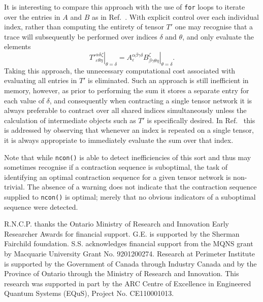 \documentclass[aps,prb,reprint,superscriptaddress,amsmath,amsfonts]{revtex4-1}
\theoremstyle{definition}
\newcommand{\rcite}[1]{Ref.~\onlinecite{#1}}
\newcommand{\ttt}[1]{\texttt{#1}}
\begin{document}
It is interesting to compare this approach with the use of \ttt{for} loops to iterate over the entries in $A$ and $B$ as in \rcite{lam1997}. With explicit control over each individual index, rather than computing the entirety of tensor $T'$ one may recognise that a trace will subsequently be performed over indices $\delta$ and $\theta$, and only evaluate the elements 
\begin{equation}
\left.T'{}^{\alpha\delta\zeta}_{\varepsilon\theta\eta}\right|_{\theta=\delta} = \left.A^{\alpha\beta\gamma\delta}_\varepsilon B^\zeta_{\beta\gamma\theta\eta}\right|_{\theta=\delta}. 
\end{equation}
Taking this approach, the unnecessary computational cost associated with evaluating all entries in $T'$ is eliminated. Such an approach is still inefficient in memory, however, as prior to performing the sum it stores a separate entry for each value of $\delta$,
and consequently when contracting a single tensor network it is always preferable to contract over all shared indices simultaneously %
unless the calculation of intermediate objects such as $T'$ is specifically desired.
In \rcite{lam1997} this is addressed by observing that whenever an index is repeated on a single tensor, it is always appropriate to immediately evaluate the sum over that index.



Note that while \ttt{ncon()} is able to detect inefficiencies of this sort and thus may sometimes recognise
if a contraction sequence is suboptimal, the task of identifying an optimal contraction sequence for a given tensor network is non-trivial.\cite{pfeifer2013a} The %
absence of a warning does not indicate that the contraction sequence supplied to \ttt{ncon()} is optimal; merely that no obvious indicators of a suboptimal sequence were detected.




\begin{acknowledgments}
R.N.C.P. thanks the Ontario Ministry of Research and Innovation Early Researcher Awards for financial support. G.E. is supported by the Sherman Fairchild foundation. S.S. acknowledges financial support from the MQNS grant by Macquarie University Grant No. 9201200274. Research at Perimeter Institute is supported by the Government of Canada through Industry Canada and by the Province of Ontario through the Ministry of Research and Innovation. This research was supported in part by the ARC Centre of Excellence in Engineered Quantum Systems (EQuS), Project No. CE110001013.
\end{acknowledgments}



\end{document}
